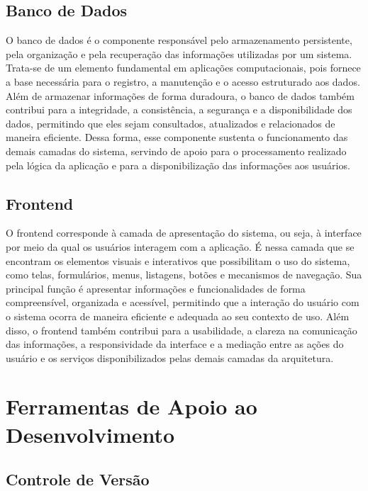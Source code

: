 \documentclass[grad,pdftex]{poli}
\begin{document}
\subsection{Banco de Dados}

O banco de dados é o componente responsável pelo armazenamento persistente, pela organização e pela recuperação das informações utilizadas por um sistema. Trata-se de um elemento fundamental em aplicações computacionais, pois fornece a base necessária para o registro, a manutenção e o acesso estruturado aos dados. Além de armazenar informações de forma duradoura, o banco de dados também contribui para a integridade, a consistência, a segurança e a disponibilidade dos dados, permitindo que eles sejam consultados, atualizados e relacionados de maneira eficiente. Dessa forma, esse componente sustenta o funcionamento das demais camadas do sistema, servindo de apoio para o processamento realizado pela lógica da aplicação e para a disponibilização das informações aos usuários.


\subsection{Frontend}

O frontend corresponde à camada de apresentação do sistema, ou seja, à interface por meio da qual os usuários interagem com a aplicação. É nessa camada que se encontram os elementos visuais e interativos que possibilitam o uso do sistema, como telas, formulários, menus, listagens, botões e mecanismos de navegação. Sua principal função é apresentar informações e funcionalidades de forma compreensível, organizada e acessível, permitindo que a interação do usuário com o sistema ocorra de maneira eficiente e adequada ao seu contexto de uso. Além disso, o frontend também contribui para a usabilidade, a clareza na comunicação das informações, a responsividade da interface e a mediação entre as ações do usuário e os serviços disponibilizados pelas demais camadas da arquitetura.



\section{Ferramentas de Apoio ao Desenvolvimento}

\subsection{Controle de Versão}
\end{document}
